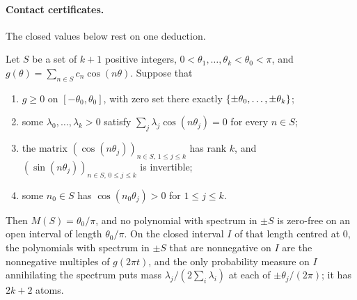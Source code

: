 \paragraph{Contact certificates.}
The closed values below rest on one deduction.

\begin{lemma}\label{zfg:lem:cert}
Let $S$ be a set of $k+1$ positive integers, $0<\theta_1,\dots,\theta_k<\theta_0<\pi$, and $g(\theta)=\sum_{n\in S}c_n\cos(n\theta)$.
Suppose that
\begin{enumerate}
\item $g\ge0$ on $[-\theta_0,\theta_0]$, with zero set there exactly $\{\pm\theta_0,\dots,\pm\theta_k\}$;
\item some $\lambda_0,\dots,\lambda_k>0$ satisfy $\sum_j\lambda_j\cos(n\theta_j)=0$ for every $n\in S$;
\item the matrix $(\cos(n\theta_j))_{n\in S,\,1\le j\le k}$ has rank $k$, and $(\sin(n\theta_j))_{n\in S,\,0\le j\le k}$ is invertible;
\item some $n_0\in S$ has $\cos(n_0\theta_j)>0$ for $1\le j\le k$.
\end{enumerate}
Then $M(S)=\theta_0/\pi$, and no polynomial with spectrum in $\pm S$ is zero-free on an open interval of length
$\theta_0/\pi$. On the closed interval $I$ of that length centred at $0$, the polynomials with spectrum in $\pm S$ that are
nonnegative on $I$ are the nonnegative multiples of $g(2\pi t)$, and the only probability measure on $I$ annihilating
the spectrum puts mass $\lambda_j/(2\sum_i\lambda_i)$ at each of $\pm\theta_j/(2\pi)$; it has $2k+2$ atoms.
\end{lemma}

